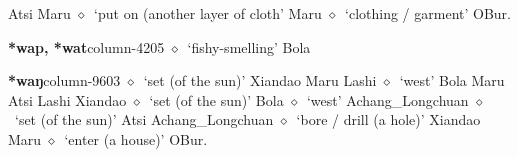          Atsi 
\hspace{1ex}
         Maru 
\hspace{1ex}
         $\diamond$~`put on (another layer of cloth'
         Maru 
\hspace{1ex}
         $\diamond$~`clothing / garment'
         OBur. 
  \item {\footnotesize \textbf{*wap, *wat}}{\tiny column-4205}
         $\diamond$~`fishy-smelling'
         Bola 
  \item {\footnotesize \textbf{*waŋ}}{\tiny column-9603}
         $\diamond$~`set (of the sun)'
         Xiandao 
\hspace{1ex}
         Maru 
\hspace{1ex}
         Lashi 
\hspace{1ex}
         $\diamond$~`west'
         Bola 
\hspace{1ex}
         Maru 
\hspace{1ex}
         Atsi 
\hspace{1ex}
         Lashi 
\hspace{1ex}
         Xiandao 
\hspace{1ex}
         $\diamond$~`set (of the sun)'
         Bola 
\hspace{1ex}
         $\diamond$~`west'
         Achang\_Longchuan 
\hspace{1ex}
         $\diamond$~`set (of the sun)'
         Atsi 
\hspace{1ex}
         Achang\_Longchuan 
\hspace{1ex}
         $\diamond$~`bore / drill (a hole)'
         Xiandao 
\hspace{1ex}
         Maru 
\hspace{1ex}
         $\diamond$~`enter (a house)'
         OBur. 
\hspace{1ex}
